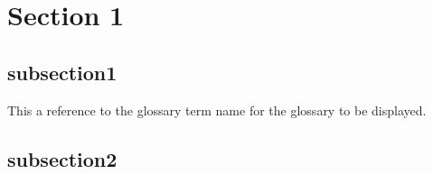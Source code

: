 \section{Section 1}

\subsection{subsection1}

This a reference to the glossary term \gls{name} for the glossary to be displayed.


\subsection{subsection2}




\clearpage  %